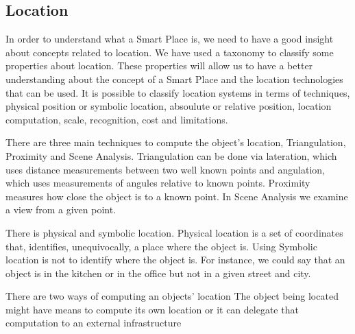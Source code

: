 \subsection{Location}
\label{sec:background_location}
In order to understand what a Smart Place is, we need to have a good insight about concepts related to location.
We have used a taxonomy\cite{location} to classify some properties about location.
These properties will allow us to have a better understanding about the concept of a Smart Place and the location technologies that can be used.
It is possible to classify location systems in terms of techniques, physical position or symbolic location, absoulute or relative position, location computation, scale, recognition, cost and limitations.

There are three main techniques to compute the object's location, Triangulation, Proximity and Scene Analysis.
Triangulation can be done via lateration, which uses distance measurements between two well known points and angulation, which uses measurements of angules relative to known points.
Proximity measures how close the object is to a known point.
In Scene Analysis we examine a view from a given point.

There is physical and symbolic location.
Physical location is a set of coordinates that, identifies, unequivocally, a place where the object is.
Using Symbolic location is not to identify where the object is. For instance, we could say that an object is in the kitchen or in the office but not in a given street and city.

There are two ways of computing an objects' location
The object being located might have means to compute its own location or it can delegate that computation to an external infrastructure

